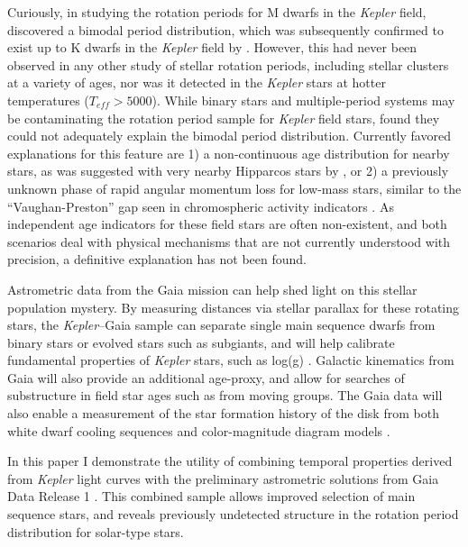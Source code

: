 \documentclass[manuscript, letterpaper]{aastex6}
\newcommand{\Kepler}{\textsl{Kepler}\xspace}
\begin{document}
Curiously, in studying the rotation periods for M dwarfs in the \Kepler field, \citet{mcquillan2013} discovered a bimodal period distribution, which was subsequently confirmed to exist up to K dwarfs in the \Kepler field by \citet{mcquillan2014}. However, this had never been observed in any other study of stellar rotation periods, including stellar clusters at a variety of ages, nor was it detected in the \Kepler stars at hotter temperatures ($T_{eff} > 5000$). While binary stars and multiple-period systems may be contaminating the rotation period sample for \Kepler field stars, \citet{mcquillan2014} found they could not adequately explain the bimodal period distribution. Currently favored explanations for this feature are 1) a non-continuous age distribution for nearby stars, as was suggested with very nearby Hipparcos stars by \citet{hernandez2000}, or 2) a previously unknown phase of rapid angular momentum loss for low-mass stars, similar to the ``Vaughan-Preston'' gap seen in chromospheric activity indicators \citep{vaughan1980}. As independent age indicators for these field stars are often non-existent, and both scenarios deal with physical mechanisms that are not currently understood with precision, a definitive explanation has not been found.


Astrometric data from the Gaia mission \citep{gaia} can help shed light on this stellar population mystery. By measuring distances via stellar parallax for these rotating stars, the \Kepler--Gaia sample can separate single main sequence dwarfs from binary stars or evolved stars such as subgiants, and will help calibrate fundamental properties of \Kepler stars, such as log(g) \citep{creevey2013}. Galactic kinematics from Gaia will also provide an additional age-proxy, and allow for searches of substructure in field star ages such as from moving groups. The Gaia data will also enable a measurement of the star formation history of the disk from both white dwarf cooling sequences \citep{carrasco2014,gaensicke2015} and color-magnitude diagram models \citep{bertelli1999}.


In this paper I demonstrate the utility of combining temporal properties derived from \Kepler light curves with the preliminary astrometric solutions from  Gaia Data Release 1 \citep[hereafter DR1][]{gaia_dr1}. This combined sample allows improved selection of main sequence stars, and reveals previously undetected structure in the rotation period distribution for solar-type stars.
\end{document}
